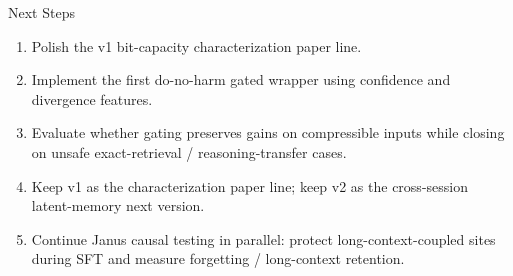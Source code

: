 \begin{frame}{Next Steps}
  \begin{enumerate}
    \item Polish the v1 bit-capacity characterization paper line.
    \item Implement the first do-no-harm gated wrapper using confidence and
      divergence features.
    \item Evaluate whether gating preserves gains on compressible inputs while
      closing on unsafe exact-retrieval / reasoning-transfer cases.
    \item Keep v1 as the characterization paper line; keep v2 as the
      cross-session latent-memory next version.
    \item Continue Janus causal testing in parallel: protect long-context-coupled
      sites during SFT and measure forgetting / long-context retention.
  \end{enumerate}
\end{frame}
